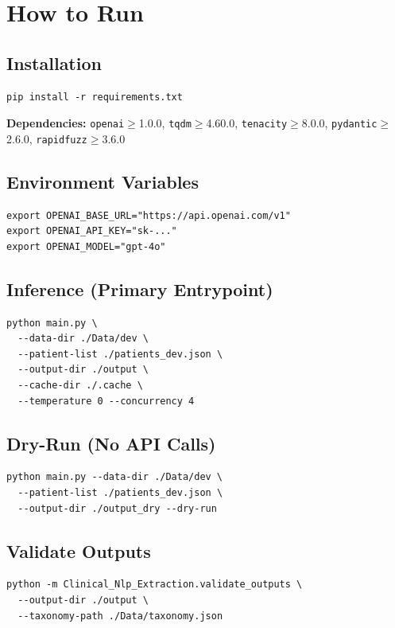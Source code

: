 \documentclass[11pt, a4paper]{article}
\begin{document}
\section{How to Run}

\subsection{Installation}
\begin{lstlisting}
pip install -r requirements.txt
\end{lstlisting}

\noindent\textbf{Dependencies:} \texttt{openai}$\geq$1.0.0, \texttt{tqdm}$\geq$4.60.0, \texttt{tenacity}$\geq$8.0.0, \texttt{pydantic}$\geq$2.6.0, \texttt{rapidfuzz}$\geq$3.6.0

\subsection{Environment Variables}
\begin{lstlisting}
export OPENAI_BASE_URL="https://api.openai.com/v1"
export OPENAI_API_KEY="sk-..."
export OPENAI_MODEL="gpt-4o"
\end{lstlisting}

\subsection{Inference (Primary Entrypoint)}
\begin{lstlisting}
python main.py \
  --data-dir ./Data/dev \
  --patient-list ./patients_dev.json \
  --output-dir ./output \
  --cache-dir ./.cache \
  --temperature 0 --concurrency 4
\end{lstlisting}

\subsection{Dry-Run (No API Calls)}
\begin{lstlisting}
python main.py --data-dir ./Data/dev \
  --patient-list ./patients_dev.json \
  --output-dir ./output_dry --dry-run
\end{lstlisting}

\subsection{Validate Outputs}
\begin{lstlisting}
python -m Clinical_Nlp_Extraction.validate_outputs \
  --output-dir ./output \
  --taxonomy-path ./Data/taxonomy.json
\end{lstlisting}
\end{document}
